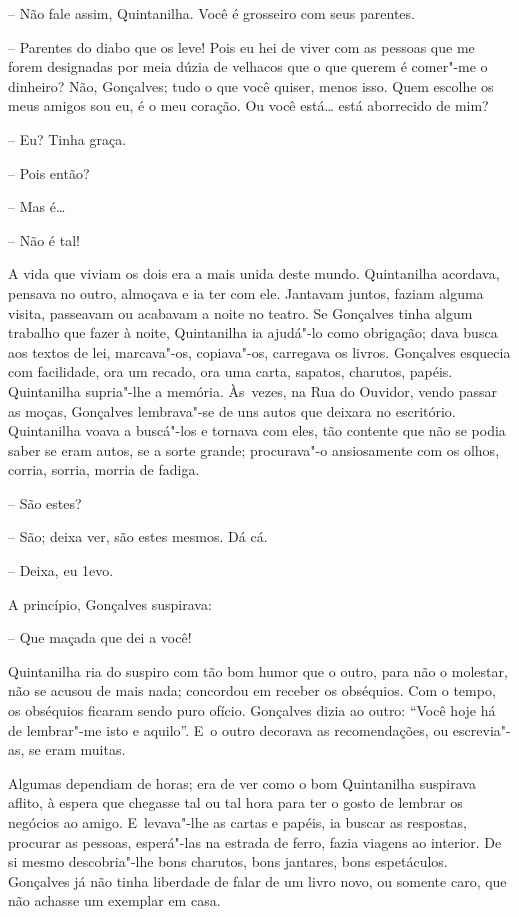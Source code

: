 -- Não fale assim, Quintanilha. Você é grosseiro com seus parentes.

-- Parentes do diabo que os leve! Pois eu hei de viver com as pessoas
que me forem designadas por meia dúzia de velhacos que o que querem é
comer"-me o dinheiro? Não, Gonçalves; tudo o que você quiser, menos isso.
Quem escolhe os meus amigos sou eu, é o meu coração. Ou você está\ldots{}
está aborrecido de mim?

-- Eu? Tinha graça.

-- Pois então?

-- Mas é\ldots{}

-- Não é tal!

A vida que viviam os dois era a mais unida deste mundo. Quintanilha
acordava, pensava no outro, almoçava e ia ter com ele. Jantavam juntos,
faziam alguma visita, passeavam ou acabavam a noite no teatro. Se
Gonçalves tinha algum trabalho que fazer à noite, Quintanilha ia
ajudá"-lo como obrigação; dava busca aos textos de lei, marcava"-os,
copiava"-os, carregava os livros. Gonçalves esquecia com facilidade, ora
um recado, ora uma carta, sapatos, charutos, papéis. Quintanilha
supria"-lhe a memória. Às~vezes, na Rua do Ouvidor, vendo passar as
moças, Gonçalves lembrava"-se de uns autos que deixara no escritório.
Quintanilha voava a buscá"-los e tornava com eles, tão contente que não
se podia saber se eram autos, se a sorte grande; procurava"-o
ansiosamente com os olhos, corria, sorria, morria de fadiga.

-- São estes?

-- São; deixa ver, são estes mesmos. Dá cá.

-- Deixa, eu 1evo.

A princípio, Gonçalves suspirava:

-- Que maçada que dei a você!

Quintanilha ria do suspiro com tão bom humor que o outro, para não o
molestar, não se acusou de mais nada; concordou em receber os obséquios.
Com o tempo, os obséquios ficaram sendo puro ofício. Gonçalves dizia ao
outro: ``Você hoje há de lembrar"-me isto e aquilo''. E~o outro decorava
as recomendações, ou escrevia"-as, se eram muitas.

Algumas dependiam de horas; era de ver como o bom Quintanilha suspirava
aflito, à espera que chegasse tal ou tal hora para ter o gosto de
lembrar os negócios ao amigo. E~levava"-lhe as cartas e papéis, ia buscar
as respostas, procurar as pessoas, esperá"-las na estrada de ferro, fazia
viagens ao interior. De si mesmo descobria"-lhe bons charutos, bons
jantares, bons espetáculos. Gonçalves já não tinha liberdade de falar de
um livro novo, ou somente caro, que não achasse um exemplar em casa.

